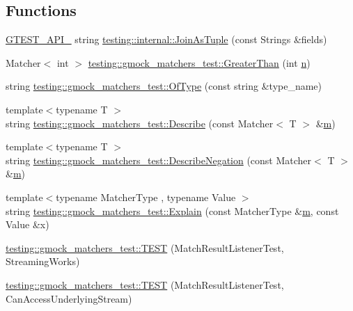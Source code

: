 \subsection*{Functions}
\begin{DoxyCompactItemize}
\item 
\hyperlink{gtest-port_8h_aa73be6f0ba4a7456180a94904ce17790}{G\+T\+E\+S\+T\+\_\+\+A\+P\+I\+\_\+} string \hyperlink{namespacetesting_1_1internal_a61d60981533cb0875bad9025e0d98b74}{testing\+::internal\+::\+Join\+As\+Tuple} (const Strings \&fields)
\item 
Matcher$<$ int $>$ \hyperlink{namespacetesting_1_1gmock__matchers__test_a8cf8614a7c9adc8fb00e8af04895f97c}{testing\+::gmock\+\_\+matchers\+\_\+test\+::\+Greater\+Than} (int \hyperlink{app_2main_8cpp_acfc02ec89670db29251fda6a66602ce2}{n})
\item 
string \hyperlink{namespacetesting_1_1gmock__matchers__test_a5d48d2ef7ca374de369c5f0a30e32343}{testing\+::gmock\+\_\+matchers\+\_\+test\+::\+Of\+Type} (const string \&type\+\_\+name)
\item 
{\footnotesize template$<$typename T $>$ }\\string \hyperlink{namespacetesting_1_1gmock__matchers__test_a36ae44e4f6c8e9fe3fe9162132503717}{testing\+::gmock\+\_\+matchers\+\_\+test\+::\+Describe} (const Matcher$<$ T $>$ \&\hyperlink{app_2main_8cpp_a0d2d8836216fc94b61aa0824eb239db2}{m})
\item 
{\footnotesize template$<$typename T $>$ }\\string \hyperlink{namespacetesting_1_1gmock__matchers__test_afbc8022da5a58aa467ec414ab3e90908}{testing\+::gmock\+\_\+matchers\+\_\+test\+::\+Describe\+Negation} (const Matcher$<$ T $>$ \&\hyperlink{app_2main_8cpp_a0d2d8836216fc94b61aa0824eb239db2}{m})
\item 
{\footnotesize template$<$typename Matcher\+Type , typename Value $>$ }\\string \hyperlink{namespacetesting_1_1gmock__matchers__test_a6215aeb6213a03f4233924ef1c74d968}{testing\+::gmock\+\_\+matchers\+\_\+test\+::\+Explain} (const Matcher\+Type \&\hyperlink{app_2main_8cpp_a0d2d8836216fc94b61aa0824eb239db2}{m}, const Value \&x)
\item 
\hyperlink{namespacetesting_1_1gmock__matchers__test_a7bc21ec910c3861034d1336fecfcc260}{testing\+::gmock\+\_\+matchers\+\_\+test\+::\+T\+E\+ST} (Match\+Result\+Listener\+Test, Streaming\+Works)
\item 
\hyperlink{namespacetesting_1_1gmock__matchers__test_abc02b215e80c57464c83abdf297b9db7}{testing\+::gmock\+\_\+matchers\+\_\+test\+::\+T\+E\+ST} (Match\+Result\+Listener\+Test, Can\+Access\+Underlying\+Stream)

\end{DoxyCompactItemize}

